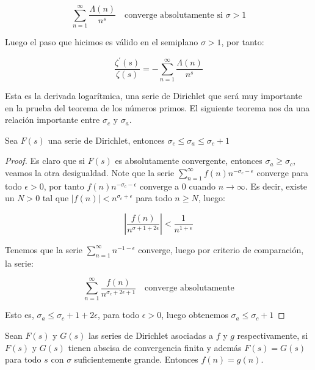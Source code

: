 $$\sum_{n=1}^{\infty} \frac{\Lambda(n)}{n^s}\quad \text{converge absolutamente si } \sigma>1$$

Luego el paso que hicimos es válido en el semiplano $\sigma>1$, por tanto:

$$\frac{\zeta^{\prime}(s)}{\zeta(s)}=-\sum_{n=1}^{\infty} \frac{\Lambda(n)}{n^s}$$

Esta es la derivada logarítmica, una serie de Dirichlet que será muy importante en la prueba del teorema de los números primos. El siguiente teorema nos da una relación importante entre $\sigma_c$ y $\sigma_a$.

\begin{theorem}
Sea $F(s)$ una serie de Dirichlet, entonces $\sigma_c\leq\sigma_a\leq \sigma_c+1$
\end{theorem}

\begin{proof}
Es claro que si $F(s)$ es absolutamente convergente, entonces $\sigma_a\geq \sigma_c$, veamos la otra desigualdad. Note que la serie $\displaystyle \sum_{n=1}^{\infty} f(n)n^{-\sigma_c-\epsilon}$ converge para todo $\epsilon>0$, por tanto $f(n)n^{-\sigma_c-\epsilon}$ converge a 0 cuando $n\to \infty$. Es decir, existe un $N>0$ tal que $|f(n)|<n^{\sigma_c+\epsilon}$ para todo $n\geq N$, luego:

$$\left|\frac{f(n)}{n^{\sigma+1+2\epsilon}}\right|<\frac{1}{n^{1+\epsilon}}$$

Tenemos que la serie $\displaystyle \sum_{n=1}^{\infty} n^{-1-\epsilon}$ converge, luego por criterio de comparación, la serie:

$$\sum_{n=1}^{\infty} \frac{f(n)}{n^{\sigma_c+2\epsilon+1}} \quad\text{converge absolutamente}$$

Esto es, $\sigma_a\leq \sigma_c+1+2\epsilon$, para todo $\epsilon>0$, luego obtenemos $\sigma_a\leq \sigma_c+1$
\end{proof}

\begin{theorem}[Unicidad]

Sean $F(s)$ y $G(s)$ las series de Dirichlet asociadas a $f$ y $g$ respectivamente, si $F(s)$ y $G(s)$ tienen abscisa de convergencia finita y además $F(s)=G(s)$ para  todo $s$ con $\sigma$ suficientemente grande. Entonces $f(n)=g(n)$.
\end{theorem}

